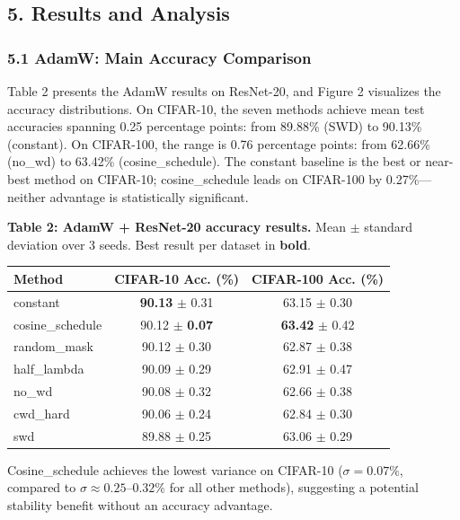 \documentclass[
]{article}
\begin{document}
\hypertarget{results-and-analysis}{%
\subsection{5. Results and Analysis}\label{results-and-analysis}}

\hypertarget{adamw-main-accuracy-comparison}{%
\subsubsection{5.1 AdamW: Main Accuracy
Comparison}\label{adamw-main-accuracy-comparison}}

Table 2 presents the AdamW results on ResNet-20, and Figure 2 visualizes
the accuracy distributions. On CIFAR-10, the seven methods achieve mean
test accuracies spanning 0.25 percentage points: from 89.88\% (SWD) to
90.13\% (constant). On CIFAR-100, the range is 0.76 percentage points:
from 62.66\% (no\_wd) to 63.42\% (cosine\_schedule). The constant
baseline is the best or near-best method on CIFAR-10; cosine\_schedule
leads on CIFAR-100 by 0.27\%---neither advantage is statistically
significant.

\textbf{Table 2: AdamW + ResNet-20 accuracy results.} Mean \(\pm\)
standard deviation over 3 seeds. Best result per dataset in
\textbf{bold}.

\begin{longtable}[]{@{}lcc@{}}
\toprule\noalign{}
Method & CIFAR-10 Acc. (\%) & CIFAR-100 Acc. (\%) \\
\midrule\noalign{}
\endhead
\bottomrule\noalign{}
\endlastfoot
constant & \textbf{90.13} \(\pm\) 0.31 & 63.15 \(\pm\) 0.30 \\
cosine\_schedule & 90.12 \(\pm\) \textbf{0.07} & \textbf{63.42} \(\pm\)
0.42 \\
random\_mask & 90.12 \(\pm\) 0.30 & 62.87 \(\pm\) 0.38 \\
half\_lambda & 90.09 \(\pm\) 0.29 & 62.91 \(\pm\) 0.47 \\
no\_wd & 90.08 \(\pm\) 0.32 & 62.66 \(\pm\) 0.38 \\
cwd\_hard & 90.06 \(\pm\) 0.24 & 62.84 \(\pm\) 0.30 \\
swd & 89.88 \(\pm\) 0.25 & 63.06 \(\pm\) 0.29 \\
\end{longtable}

Cosine\_schedule achieves the lowest variance on CIFAR-10
(\(\sigma = 0.07\%\), compared to \(\sigma \approx 0.25\)--\(0.32\%\)
for all other methods), suggesting a potential stability benefit without
an accuracy advantage.
\end{document}
